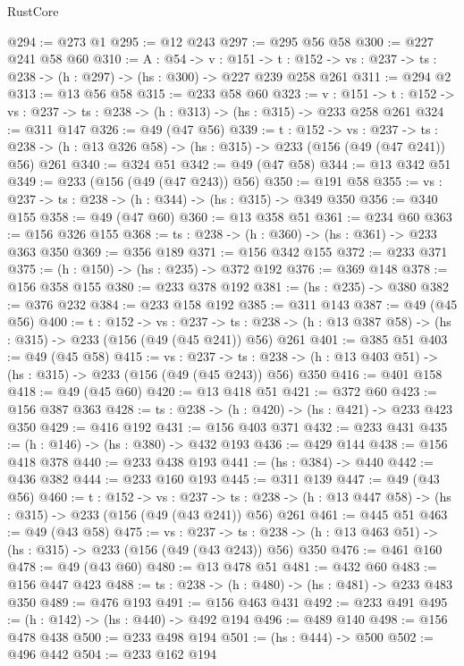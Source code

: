 \begin{lexlean}{RustCore}
\begin{coremodule}
@294 := @273 @1
@295 := @12 @243
@297 := @295 @56 @58
@300 := @227 @241 @58 @60
@310 := {A : @54} ->
  {v : @151} ->
  {t : @152} -> {vs : @237} -> {ts : @238} -> (h : @297) -> (hs : @300) -> @227 @239 @258 @261
@311 := @294 @2
@313 := @13 @56 @58
@315 := @233 @58 @60
@323 := {v : @151} ->
  {t : @152} -> {vs : @237} -> {ts : @238} -> (h : @313) -> (hs : @315) -> @233 @258 @261
@324 := @311 @147
@326 := @49 (@47 @56)
@339 := {t : @152} ->
  {vs : @237} ->
  {ts : @238} -> (h : @13 @326 @58) -> (hs : @315) -> @233 (@156 (@49 (@47 @241)) @56) @261
@340 := @324 @51
@342 := @49 (@47 @58)
@344 := @13 @342 @51
@349 := @233 (@156 (@49 (@47 @243)) @56)
@350 := @191 @58
@355 := {vs : @237} -> {ts : @238} -> (h : @344) -> (hs : @315) -> @349 @350
@356 := @340 @155
@358 := @49 (@47 @60)
@360 := @13 @358 @51
@361 := @234 @60
@363 := @156 @326 @155
@368 := {ts : @238} -> (h : @360) -> (hs : @361) -> @233 @363 @350
@369 := @356 @189
@371 := @156 @342 @155
@372 := @233 @371
@375 := (h : @150) -> (hs : @235) -> @372 @192
@376 := @369 @148
@378 := @156 @358 @155
@380 := @233 @378 @192
@381 := (hs : @235) -> @380
@382 := @376 @232
@384 := @233 @158 @192
@385 := @311 @143
@387 := @49 (@45 @56)
@400 := {t : @152} ->
  {vs : @237} ->
  {ts : @238} -> (h : @13 @387 @58) -> (hs : @315) -> @233 (@156 (@49 (@45 @241)) @56) @261
@401 := @385 @51
@403 := @49 (@45 @58)
@415 := {vs : @237} ->
  {ts : @238} -> (h : @13 @403 @51) -> (hs : @315) -> @233 (@156 (@49 (@45 @243)) @56) @350
@416 := @401 @158
@418 := @49 (@45 @60)
@420 := @13 @418 @51
@421 := @372 @60
@423 := @156 @387 @363
@428 := {ts : @238} -> (h : @420) -> (hs : @421) -> @233 @423 @350
@429 := @416 @192
@431 := @156 @403 @371
@432 := @233 @431
@435 := (h : @146) -> (hs : @380) -> @432 @193
@436 := @429 @144
@438 := @156 @418 @378
@440 := @233 @438 @193
@441 := (hs : @384) -> @440
@442 := @436 @382
@444 := @233 @160 @193
@445 := @311 @139
@447 := @49 (@43 @56)
@460 := {t : @152} ->
  {vs : @237} ->
  {ts : @238} -> (h : @13 @447 @58) -> (hs : @315) -> @233 (@156 (@49 (@43 @241)) @56) @261
@461 := @445 @51
@463 := @49 (@43 @58)
@475 := {vs : @237} ->
  {ts : @238} -> (h : @13 @463 @51) -> (hs : @315) -> @233 (@156 (@49 (@43 @243)) @56) @350
@476 := @461 @160
@478 := @49 (@43 @60)
@480 := @13 @478 @51
@481 := @432 @60
@483 := @156 @447 @423
@488 := {ts : @238} -> (h : @480) -> (hs : @481) -> @233 @483 @350
@489 := @476 @193
@491 := @156 @463 @431
@492 := @233 @491
@495 := (h : @142) -> (hs : @440) -> @492 @194
@496 := @489 @140
@498 := @156 @478 @438
@500 := @233 @498 @194
@501 := (hs : @444) -> @500
@502 := @496 @442
@504 := @233 @162 @194

\end{coremodule}
\end{lexlean}
